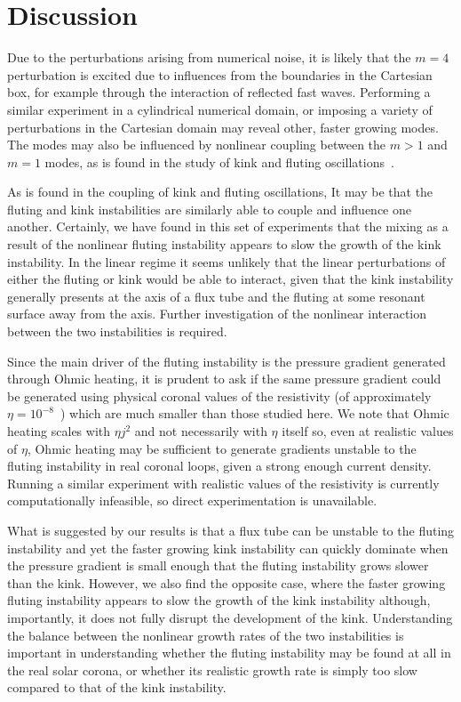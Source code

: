 \section{Discussion}

Due to the perturbations arising from numerical noise, it is likely that the $m=4$ perturbation is excited due to influences from the boundaries in the Cartesian box, for example through the interaction of reflected fast waves. Performing a similar experiment in a cylindrical numerical domain, or imposing a variety of perturbations in the Cartesian domain may reveal other, faster growing modes. The modes may also be influenced by nonlinear coupling between the $m>1$ and $m=1$ modes, as is found in the study of kink and fluting oscillations~\cite{terradasEffectMagneticTwist2018,rudermanNonlinearGenerationFluting2017a}.

As is found in the coupling of kink and fluting oscillations, It may be that the fluting and kink instabilities are similarly able to couple and influence one another. Certainly, we have found in this set of experiments that the mixing as a result of the nonlinear fluting instability appears to slow the growth of the kink instability. In the linear regime it seems unlikely that the linear perturbations of either the fluting or kink would be able to interact, given that the kink instability generally presents at the axis of a flux tube and the fluting at some resonant surface away from the axis. Further investigation of the nonlinear interaction between the two instabilities is required.

Since the main driver of the fluting instability is the pressure gradient generated through Ohmic heating, it is prudent to ask if the same pressure gradient could be generated using physical coronal values of the resistivity (of approximately $\eta=10^{-8}$~\cite{craigAnisotropicViscousDissipation2009a}) which are much smaller than those studied here. We note that Ohmic heating scales with $\eta j^2$ and not necessarily with $\eta$ itself so, even at realistic values of $\eta$, Ohmic heating may be sufficient to generate gradients unstable to the fluting instability in real coronal loops, given a strong enough current density. Running a similar experiment with realistic values of the resistivity is currently computationally infeasible, so direct experimentation is unavailable.

What is suggested by our results is that a flux tube can be unstable to the fluting instability and yet the faster growing kink instability can quickly dominate when the pressure gradient is small enough that the fluting instability grows slower than the kink. However, we also find the opposite case, where the faster growing fluting instability appears to slow the growth of the kink instability although, importantly, it does not fully disrupt the development of the kink. Understanding the balance between the nonlinear growth rates of the two instabilities is important in understanding whether the fluting instability may be found at all in the real solar corona, or whether its realistic growth rate is simply too slow compared to that of the kink instability.

